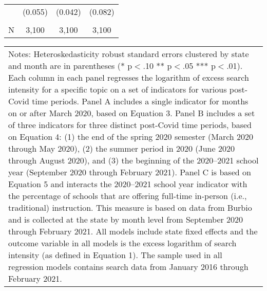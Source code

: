 \begin{table}[htbp]
\begin{tabular*}{1\textwidth}{@{\extracolsep{\fill}}l*{3}{c}}
                    &     (0.055)         &     (0.042)         &     (0.082)         \\
[1em]
                    &                     &                     &                     \\
N                   &       3,100         &       3,100         &       3,100         \\
\midrule
\end{tabular*}
\begin{tabular*}{1\textwidth}{p{6.4in}}
\footnotesize Notes: Heteroskedasticity robust standard errors clustered by state and month are in parentheses (* p$<$.10 ** p$<$.05 *** p$<$.01). Each column in each panel regresses the logarithm of excess search intensity for a specific topic on a set of indicators for various post-Covid time periods. Panel A includes a single indicator for months on or after March 2020, based on Equation 3. Panel B includes a set of three indicators for three distinct post-Covid time periods, based on Equation 4: (1) the end of the spring 2020 semester (March 2020 through May 2020), (2) the summer period in 2020 (June 2020 through August 2020), and (3) the beginning of the 2020--2021 school year (September 2020 through February 2021). Panel C is based on Equation 5 and interacts the 2020--2021 school year indicator with the percentage of schools that are offering full-time in-person (i.e., traditional) instruction. This measure is based on data from Burbio and is collected at the state by month level from     September 2020 through February 2021. All models include state fixed effects and the outcome variable in all models is the excess logarithm of search intensity (as defined in Equation 1). The sample used in all regression models contains search data from January 2016 through February 2021.\end{tabular*}
\end{table}
